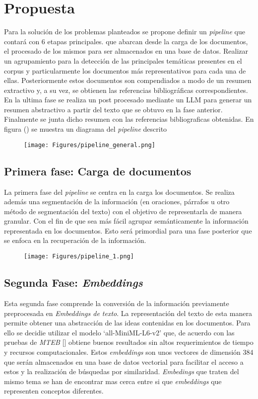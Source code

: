 \chapter{Propuesta}\label{chapter:proposal}
    Para la solución de los problemas planteados se propone definir un \emph{pipeline} que contará con 6 etapas principales.
    que abarcan desde la carga de los documentos, el procesado de los mismos para ser almacenados en una base de datos. Realizar un agrupamiento para la detección de las principales temáticas presentes en el corpus y particularmente los documentos más representativos para cada una de ellas. Posteriormente estos documentos son compendiados a modo de un resumen extractivo y, a su vez, se obtienen las referencias bibliográficas correspondientes. En la ultima fase se realiza un post procesado mediante un LLM para generar un resumen abstractivo a partir del texto que se obtuvo en la fase anterior. Finalmente se junta dicho resumen con las referencias bibliograficas obtenidas. En figura () se muestra un diagrama del \emph{pipeline} descrito

    \begin{figure}[H]    
        \centering
        \texttt{[image: Figures/pipeline\_general.png]}
        \caption*{}
    \end{figure}
    

    \section{Primera fase: Carga de documentos} 
    La primera fase del \emph{pipeline} se centra en la carga los documentos. Se realiza además una segmentación de la información (en oraciones, párrafos u otro método de segmentación del texto) con el objetivo de representarla de manera granular. Con el fin de que sea más fácil agrupar semánticamente la información representada en los documentos. Esto será primordial para una fase posterior que se enfoca en la recuperación de la información.

    \begin{figure}[H]    
        \centering
        \texttt{[image: Figures/pipeline\_1.png]}
        \caption*{}
    \end{figure}
    
    \section{Segunda Fase: \emph{Embeddings}}
    Esta segunda fase comprende la conversión de la información previamente preprocesada en \emph{Embeddings de texto}.
    La representación del texto de esta manera permite obtener una abstracción de las ideas contenidas en los documentos. 
    Para ello se decidie utilizar el modelo `all-MiniML-L6-v2' que, de acuerdo con las pruebas de \emph{MTEB} [\cite{leaderboard}] obtiene buenos resultados sin altos requerimientos de tiempo y recursos computacionales. Estos \emph{embeddings} son unos vectores de dimensión 384 que serán almacenados en una base de datos vectorial para facilitar el acceso a estos y la realización de búsquedas por similaridad. \emph{Embedings} que traten del mismo tema se han de encontrar mas cerca entre si que \emph{embeddings} que representen conceptos diferentes.


